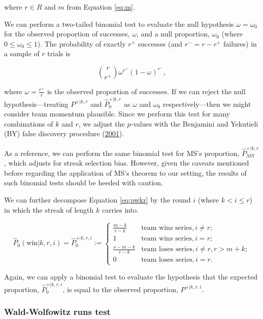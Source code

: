 \documentclass{article}
\begin{document}
where \(r \in R\) and \(m\) from Equation \ref{eq:m}.

We can perform a two-tailed binomial test to evaluate the null
hypothesis \(\omega = \omega_0\) for the observed proportion of
successes, \(\omega\), and a null proportion, \(\omega_0\) (where
\(0 \leq \omega_0 \leq 1\)). The probability of exactly \(r^+\)
successes (and \(r^- = r - r^+\) failures) in a sample of \(r\) trials
is

\begin{equation}\label{eq:binom}
\binom {r}{r^+} \omega^{r^+}(1-\omega)^{r^-},
\end{equation}

where \(\omega = \frac{r^+}{r}\) is the observed proportion of
successes. If we can reject the null hypothesis---treating \(P^{+|k,r}\)
and \(\hat{P}^{+|k,r}_0\) as \(\omega\) and \(\omega_0\)
respectively---then we might consider team momentum plausible. Since we
perform this test for many combinations of \(k\) and \(r\), we adjust
the \(p\)-values with the Benjamini and Yekutieli (BY) false discovery
procedure (\protect\hyperlink{ref-benjamini2001}{2001}).

As a reference, we can perform the same binomial test for MS's
proportion, \(\hat{P}^{+|k,r}_{MS}\), which adjusts for streak selection
bias. However, given the caveats mentioned before regarding the
application of MS's theorem to our setting, the results of such binomial
tests should be heeded with caution.

We can further decompose Equation \ref{eq:pwkr} by the round \(i\)
(where \(k < i \leq r\)) in which the streak of length \(k\) carries
into.

\begin{equation}\label{eq:pwkri}
\hat{P}_0(\text{win} | k, r, i) = \hat{P}^{+|k,r,i}_0 := \begin{cases}
\frac{m - k}{r - k} & \text{team wins series}, i \neq r; \\
1 & \text{team wins series}, i = r; \\
\frac{s - m - k}{r - k} & \text{team loses series}, i \neq r, r > m + k; \\
0 & \text{team loses series}, i = r.
\end{cases}
\end{equation}

Again, we can apply a binomial test to evaluate the hypothesis that the
expected proportion, \(\hat{P}^{+|k,r,i}_0\), is equal to the observed
proportion, \(P^{+|k,r,i}\).

\hypertarget{wald-wolfowitz-runs-test}{%
\subsubsection{Wald-Wolfowitz runs
test}\label{wald-wolfowitz-runs-test}}
\end{document}
